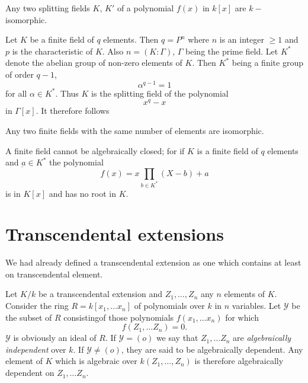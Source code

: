 \begin{thm}\label{c1:thm6}%
Any two splitting fields $K$, $K'$ of a polynomial $ f (x) $ in $
  k [ x ] $ are $ k-$ isomorphic. 
\end{thm}

Let $K$ be a finite field of  $q$  elements. Then $ q= P^n $ where
$n$  is an integer $\geq 1 $ and $ p $ is the characteristic of
$K$. Also $n = ( K: \Gamma )$, $\Gamma$ being the prime field. Let
$K^*$  denote  the abelian group of non-zero elements of $K$. Then $
K^* $ being a finite group of order $q - 1$, 
$$
\alpha^{q-1} = 1 
$$ 
for all $ \alpha \in K^* $. Thus $K$ is the  splitting field of the
polynomial  
$$
x^q - x
$$
in $ \Gamma [ x ] $. It therefore follows 

\begin{thm}\label{c1:thm7}%
Any two finite fields  with the  same number of elements are isomorphic.
\end{thm}

A finite field cannot be algebraically closed; for if $K$ is a  finite
field of $q$  elements  and $ \underbar{a} \in K^*$ the polynomial  
$$
f (x) = x \prod_{b \in K^*}( X-b )  + a
$$
is in $ K [ x ] $ and  has no root in $K$.


\section{Transcendental extensions}\label{c1:s5} %
 
 We had already defined a transcendental extension as one which contains
 at least on transcendental element. 
 
 Let $K/k$ be a transcendental extension and $ Z_1, \ldots , Z_n $ any
 $n$  elements of $K$. Consider the ring $ R = k [ x_1, \ldots x_n ] $
 of polynomials over $k$ in $n$  variables. Let $ \mathscr{Y} $ be
 the subset of $R$  consisting\pageoriginale of those polynomials  $ f
 ( x_1, \ldots  x_n ) $  for which   
 $$
 f (Z_1, \ldots Z_n ) = 0 .
 $$
 $\mathscr{Y}$ is obviously an ideal of $R$. If $ \mathscr{Y} = (o) $
 we say that $ Z_1, \ldots Z_n $ are \textit{algebraically
   independent} over $k$. If $ \mathscr{Y} \neq (o) $, they are said to
 be algebraically dependent. Any element of $K$  which is algebraic
 over $ k ( Z_1,\ldots , Z_n )$ is therefore algebraically dependent
 on $ Z_1, \ldots Z_n $. 

